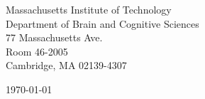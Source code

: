 \begin{minipage}{0.49\textwidth}
\begin{flushleft}
\noindent
Massachusetts Institute of Technology\\
Department of Brain and Cognitive Sciences\\
77 Massachusetts Ave.\\
Room 46-2005\\
Cambridge, MA 02139-4307
\end{flushleft}
\end{minipage}
\begin{minipage}{0.47\textwidth}
\begin{flushright}
\today
\end{flushright}
\end{minipage} \\

\newcommand{\univ}{Massachusetts Institute of Technology}
\newcommand{\univshort}{MIT}
\newcommand{\degree}{Ph.D.}
\newcommand{\dept}{Brain and Cognitive Sciences}
